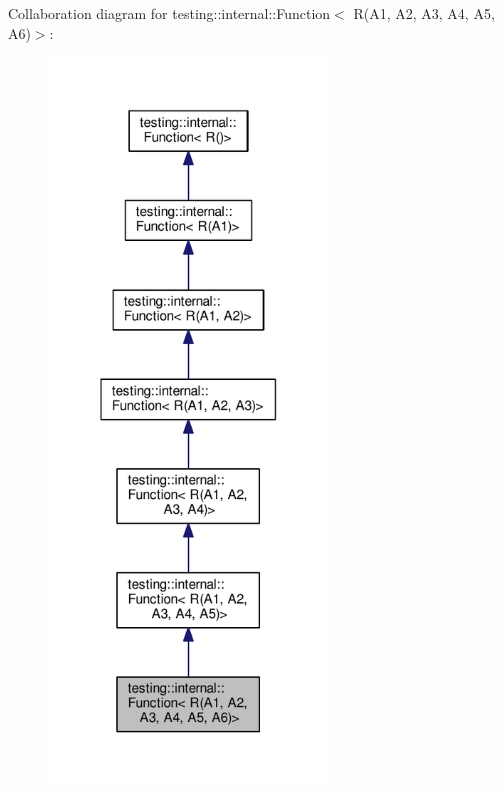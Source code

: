 Collaboration diagram for testing\+:\+:internal\+:\+:Function$<$ R(A1, A2, A3, A4, A5, A6)$>$\+:
\nopagebreak
\begin{figure}[H]
\begin{center}
\leavevmode
\includegraphics[width=211pt]{structtesting_1_1internal_1_1_function_3_01_r_07_a1_00_01_a2_00_01_a3_00_01_a4_00_01_a5_00_01_a6_08_4__coll__graph}
\end{center}
\end{figure}
